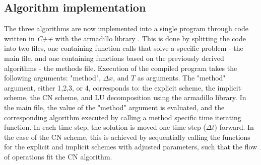 \documentclass[%
oneside,                 %
final,                   %
10pt]{article}
\begin{document}
\begin{center}\end{center}


\subsection{Algorithm implementation}
\label{M.AlgoImpl}	
The three algorithms are now implemented into a single program through code written in \textit{C++} with the armadillo library \cite{armadillo}. This is done by splitting the code into two files, one containing function calls that solve a specific problem - the main file, and one containing functions   based on the previously derived algorithms - the methods file. Execution of the compiled program takes the following arguments: "method", $\Delta x$, and $T$ as arguments. The "method" argument, either 1,2,3, or 4, corresponds to: the explicit scheme, the implicit scheme, the CN scheme, and LU decomposition using the armadillo library. In the main file, the value of the "method" argument is evaluated, and the corresponding algorithm executed by calling a method specific time iterating function. In each time step, the solution is moved one time step ($\Delta t$) forward. In the case of the CN scheme, this is achieved by sequentially calling the functions for the explicit and implicit schemes with adjusted parameters, such that the flow of operations fit the CN algorithm.
\end{document}
